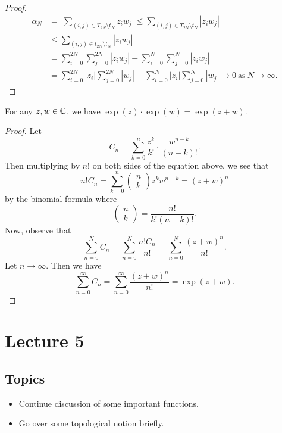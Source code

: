 \documentclass[a4paper]{report}
\begin{document}
\begin{proof}
\begin{align*}
    {\alpha}_{N} &= \Big|  \sum_{ (i,j) \in {T}_{2N} \setminus  {t}_{N} }^{  } {z}_{i} {w}_{j} \Big| \leq \sum_{ (i,j) \in {T}_{2N} \setminus {t}_{N} }^{  } | {z}_{i} {w}_{j} |  \\
                 &\leq \sum_{ (i,j) \in {t}_{2N} \setminus  {t}_{N} }^{  } | {z}_{i} {w}_{j} |  \\
                 &= \sum_{ i=0  }^{ 2N  } \sum_{ j = 0  }^{ 2N  } | {z}_{i} {w}_{j} |  - \sum_{ i = 0  }^{  N  } \sum_{ j = 0  }^{  N  } | {z}_{i} {w}_{j} |  \\
                 &= \sum_{ i = 0  }^{  2 N  } | {z}_{i} | \sum_{ j = 0  }^{  2N  } | {w}_{j} |  - \sum_{ i = 0  }^{  N  } | {z}_{i} |  \sum_{ j = 0  }^{  N  } | {w}_{j} | \to 0  \ \text{as} \ N \to \infty.
\end{align*}


\end{proof}

\begin{corollary}
   For any \( z,w \in \mathbb{C}  \), we have \( \exp(z) \cdot \exp(w) = \exp(z + w) \). 
\end{corollary}
\begin{proof}
Let
\[  {C}_{n} = \sum_{ k = 0  }^{ n  } \frac{ z^{k } }{  k!  }  \cdot \frac{ w^{n-k} }{ (n-k)! }. \]
Then multiplying by \( n!  \) on both sides of the equation above, we see that
\[  n! {C}_{n} = \sum_{ k = 0  }^{ n  } \begin{pmatrix} n \\ k  \end{pmatrix} z^{k } w^{n - k } = (z + w)^{n} \]
by the binomial formula where
\[  \begin{pmatrix} n \\ k  \end{pmatrix}  = \frac{ n!  }{ k! (n- k)! }. \]
Now, observe that
\[  \sum_{ n = 0  }^{  N  } {C}_{n} = \sum_{ n = 0  }^{  N  } \frac{ n! {C}_{n}  }{  n!  }  = \sum_{ n = 0  }^{  N  } \frac{ (z + w )^{n} }{ n!  }. \]
Let \( n \to \infty  \). Then we have
\[  \sum_{ n = 0  }^{  \infty  } {C}_{n} = \sum_{ n = 0  }^{  \infty  } \frac{ (z+w)^{n} }{ n!  }  = \exp(z+w). \]

\end{proof}


\section{Lecture 5}

\subsection{Topics}
\begin{itemize}
    \item Continue discussion of some important functions.
    \item Go over some topological notion briefly.
\end{itemize}
\end{document}
